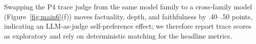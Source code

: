 Swapping the P4 trace judge from the same model family to a cross-family model (Figure~\ref{fig:main6}(f)) moves factuality, depth, and faithfulness by .40--.50 points, indicating an LLM-as-judge self-preference effect; we therefore report trace scores as exploratory and rely on deterministic matching for the headline metrics.
